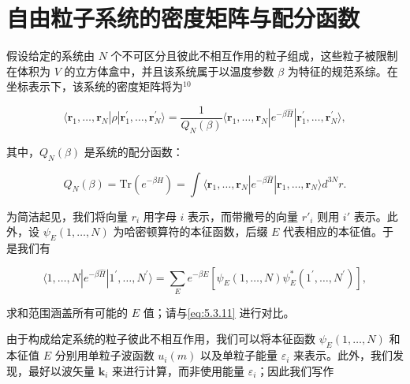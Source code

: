 \section{自由粒子系统的密度矩阵与配分函数}\label{ux81eaux7531ux7c92ux5b50ux7cfbux7edfux7684ux5bc6ux5ea6ux77e9ux9635ux4e0eux914dux5206ux51fdux6570}

假设给定的系统由 \(N\) 个不可区分且彼此不相互作用的粒子组成，这些粒子被限制在体积为 \(V\) 的立方体盒中，并且该系统属于以温度参数 \(\beta\) 为特征的规范系综。在坐标表示下，该系统的密度矩阵将为\(^{10}\)

\begin{equation}\tag{5.4.21}\label{eq:5.4.21}
\langle \pmb { r } _ { 1 } , \ldots , \pmb { r } _ { N } | \hat { \rho } | \pmb { r } _ { 1 } ^{\prime} , \ldots , \pmb { r } _ { N } ^{\prime} \rangle = \frac { 1 } { Q _ { N } ( \beta ) } \langle \pmb { r } _ { 1 } , \ldots , \pmb { r } _ { N } | e ^{- \beta \hat { H} } | \pmb { r } _ { 1 } ^{\prime} , \ldots , \pmb { r } _ { N } ^{\prime} \rangle ,
\end{equation}

其中，\(Q_{N}(\beta)\) 是系统的配分函数：

\begin{equation}\tag{5.4.22}\label{eq:5.4.22}
Q _ { N } ( \beta ) = \mathrm { T r } ( e ^{- \beta \hat { H} } ) = \int \langle \pmb { r } _ { 1 } , \dots , \pmb { r } _ { N } | e ^{- \beta \hat { H} } | \pmb { r } _ { 1 } , \dots , \pmb { r } _ { N } \rangle d ^{3 N} r .
\end{equation}

为简洁起见，我们将向量 \(r_i\) 用字母 \(i\) 表示，而带撇号的向量 \(r'_i\) 则用 \(i'\) 表示。此外，设 \(\psi_E(1,\ldots,N)\) 为哈密顿算符的本征函数，后缀 \(E\) 代表相应的本征值。于是我们有

\begin{equation}\tag{5.4.23}\label{eq:5.4.23}
\langle 1 , \ldots , N | e ^{- \beta \hat { H} } | 1 ^{\prime} , \ldots , N ^{\prime} \rangle = \sum _ { E } e ^{- \beta E} \left[ \psi _ { E } ( 1 , \ldots , N ) \psi _ { E } ^{*} ( 1 ^{\prime} , \ldots , N ^{\prime} ) \right] ,
\end{equation}

求和范围涵盖所有可能的 \(E\) 值；请与\autoref{eq:5.3.11} 进行对比。

由于构成给定系统的粒子彼此不相互作用，我们可以将本征函数 \(\psi_{E}(1,\ldots,N)\) 和本征值 \(E\) 分别用单粒子波函数 \(u_{i}(m)\) 以及单粒子能量 \(\varepsilon_{i}\) 来表示。此外，我们发现，最好以波矢量 \(\boldsymbol{k}_{i}\) 来进行计算，而非使用能量 \(\varepsilon_{i}\)；因此我们写作

